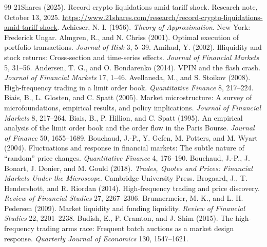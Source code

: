 \begin{thebibliography}{99}\setlength{\itemsep}{2pt}\small
{} 21Shares (2025). Record crypto liquidations amid tariff shock. Research note, October 13, 2025. \url{https://www.21shares.com/research/record-crypto-liquidations-amid-tariff-shock}.
 Achieser, N. I. (1956). \emph{Theory of Approximation}. New York: Frederick Ungar.
 Almgren, R., and N. Chriss (2001). Optimal execution of portfolio transactions. \emph{Journal of Risk} 3, 5--39.
 Amihud, Y. (2002). Illiquidity and stock returns: Cross-section and time-series effects. \emph{Journal of Financial Markets} 5, 31--56.
 Andersen, T. G., and O. Bondarenko (2014). VPIN and the flash crash. \emph{Journal of Financial Markets} 17, 1--46.
 Avellaneda, M., and S. Stoikov (2008). High-frequency trading in a limit order book. \emph{Quantitative Finance} 8, 217--224.
 Biais, B., L. Glosten, and C. Spatt (2005). Market microstructure: A survey of microfoundations, empirical results, and policy implications. \emph{Journal of Financial Markets} 8, 217--264.
 Biais, B., P. Hillion, and C. Spatt (1995). An empirical analysis of the limit order book and the order flow in the Paris Bourse. \emph{Journal of Finance} 50, 1655--1689.
 Bouchaud, J.-P., Y. Gefen, M. Potters, and M. Wyart (2004). Fluctuations and response in financial markets: The subtle nature of ``random'' price changes. \emph{Quantitative Finance} 4, 176--190.
 Bouchaud, J.-P., J. Bonart, J. Donier, and M. Gould (2018). \emph{Trades, Quotes and Prices: Financial Markets Under the Microscope}. Cambridge University Press.
 Brogaard, J., T. Hendershott, and R. Riordan (2014). High-frequency trading and price discovery. \emph{Review of Financial Studies} 27, 2267--2306.
 Brunnermeier, M. K., and L. H. Pedersen (2009). Market liquidity and funding liquidity. \emph{Review of Financial Studies} 22, 2201--2238.
 Budish, E., P. Cramton, and J. Shim (2015). The high-frequency trading arms race: Frequent batch auctions as a market design response. \emph{Quarterly Journal of Economics} 130, 1547--1621.

\end{thebibliography}
